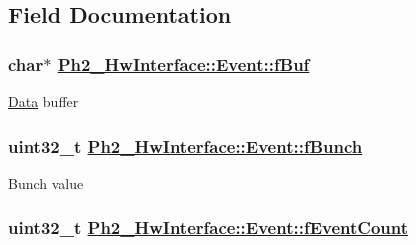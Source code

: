 \subsection{Field Documentation}
\hypertarget{class_ph2___hw_interface_1_1_event_b396cf1480f11b535d0e464aa6f9f046}{
\subsubsection[fBuf]{\setlength{\rightskip}{0pt plus 5cm}char$\ast$ \hyperlink{class_ph2___hw_interface_1_1_event_b396cf1480f11b535d0e464aa6f9f046}{Ph2\_\-Hw\-Interface::Event::f\-Buf}}}
\label{class_ph2___hw_interface_1_1_event_b396cf1480f11b535d0e464aa6f9f046}


\hyperlink{class_ph2___hw_interface_1_1_data}{Data} buffer \hypertarget{class_ph2___hw_interface_1_1_event_e5b69f2e0a9c9c947f7a37b7dcf380dc}{
\subsubsection[fBunch]{\setlength{\rightskip}{0pt plus 5cm}uint32\_\-t \hyperlink{class_ph2___hw_interface_1_1_event_e5b69f2e0a9c9c947f7a37b7dcf380dc}{Ph2\_\-Hw\-Interface::Event::f\-Bunch}}}
\label{class_ph2___hw_interface_1_1_event_e5b69f2e0a9c9c947f7a37b7dcf380dc}


Bunch value \hypertarget{class_ph2___hw_interface_1_1_event_dd8f3a445ae11e54b47af7690074a4ce}{
\subsubsection[fEventCount]{\setlength{\rightskip}{0pt plus 5cm}uint32\_\-t \hyperlink{class_ph2___hw_interface_1_1_event_dd8f3a445ae11e54b47af7690074a4ce}{Ph2\_\-Hw\-Interface::Event::f\-Event\-Count}}}
\label{class_ph2___hw_interface_1_1_event_dd8f3a445ae11e54b47af7690074a4ce}


